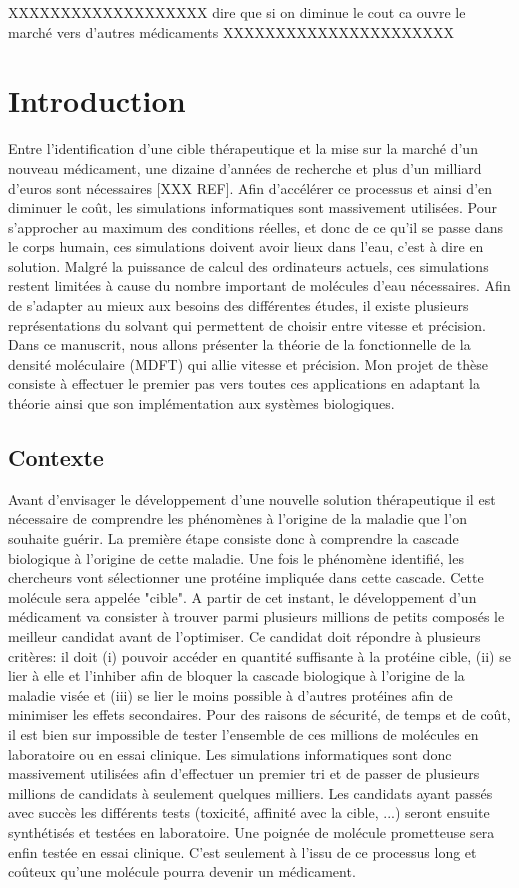 XXXXXXXXXXXXXXXXXXX dire que si on diminue le cout ca ouvre le marché vers d'autres médicaments XXXXXXXXXXXXXXXXXXXXXX 


\chapter{Introduction}
\label{chap:introduction}

Entre l'identification d'une cible thérapeutique et la mise sur la marché d'un nouveau médicament, une dizaine d'années de recherche et plus d'un milliard d’euros sont nécessaires [XXX REF]. Afin d'accélérer ce processus et ainsi d'en diminuer le coût, les simulations informatiques sont massivement utilisées. Pour s'approcher au maximum des conditions réelles, et donc de ce qu'il se passe dans le corps humain, ces simulations doivent avoir lieux dans l'eau, c'est à dire en solution. Malgré la puissance de calcul des ordinateurs actuels, ces simulations restent limitées à cause du nombre important de molécules d'eau nécessaires. Afin de s'adapter au mieux aux besoins des différentes études, il existe plusieurs représentations du solvant qui permettent de choisir entre vitesse et précision. Dans ce manuscrit, nous allons présenter la théorie de la fonctionnelle de la densité moléculaire (MDFT) qui allie vitesse et précision. Mon projet de thèse consiste à effectuer le premier pas vers toutes ces applications en adaptant la théorie ainsi que son implémentation aux systèmes biologiques.



\section{Contexte}
Avant d'envisager le développement d'une nouvelle solution thérapeutique il est nécessaire de comprendre les phénomènes à l'origine de la maladie que l'on souhaite guérir. La première étape consiste donc à comprendre la cascade biologique à l'origine de cette maladie. Une fois le phénomène identifié, les chercheurs vont sélectionner une protéine impliquée dans cette cascade. Cette molécule sera appelée "cible". A partir de cet instant, le développement d'un médicament va consister à trouver  parmi plusieurs millions de petits composés le meilleur candidat avant de l'optimiser. Ce candidat doit répondre à plusieurs critères: il doit (i) pouvoir accéder en quantité suffisante à la protéine cible, (ii) se lier à elle et l'inhiber afin de bloquer la cascade biologique à l'origine de la maladie visée et (iii) se lier le moins possible à d'autres protéines afin de minimiser les effets secondaires. Pour des raisons de sécurité, de temps et de coût, il est bien sur impossible de tester l'ensemble de ces millions de molécules en laboratoire ou en essai clinique. Les simulations informatiques sont donc massivement utilisées afin d'effectuer un premier tri et de passer de plusieurs millions de candidats à seulement quelques milliers. Les candidats ayant passés avec succès les différents tests (toxicité, affinité avec la cible, ...) seront ensuite synthétisés et testées en laboratoire. Une poignée de molécule prometteuse sera enfin testée en essai clinique. C'est seulement à l'issu de ce processus long et coûteux qu'une molécule pourra devenir un médicament.



